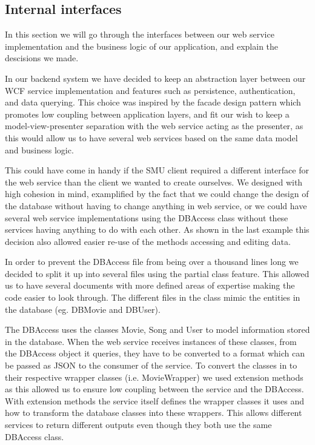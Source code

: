 \subsection{Internal interfaces}
In this section we will go through the interfaces between our web service implementation and the business logic of our application, and explain the descisions we made.

In our backend system we have decided to keep an abstraction layer between our WCF service implementation and features such as persistence, authentication, and data querying. This choice was inspired by the facade design pattern which promotes low coupling between application layers, and fit our wish to keep a model-view-presenter separation with the web service acting as the presenter, as this would allow us to have several web services based on the same data model and business logic.

This could have come in handy if the SMU client required a different interface for the web service than the client we wanted to create ourselves. We designed with high cohesion in mind, examplified by the fact that we could change the design of the database without having to change anything in web service, or we could have several web service implementations using the DBAccess class without these services having anything to do with each other. As shown in the last example this decision also allowed easier re-use of the methods accessing and editing data.

In order to prevent the DBAccess file from being over a thousand lines long we decided to split it up into several files using the partial class feature. This allowed us to have several documents with more defined areas of expertise making the code easier to look through.  The different files in the class mimic the entities in the database (eg. DBMovie and DBUser).

The DBAccess uses the classes Movie, Song and User to model information stored in the database. When the web service receives instances of these classes, from the DBAccess object it queries, they have to be converted to a format which can be passed as JSON to the consumer of the service. To convert the classes in to their respective wrapper classes (i.e. MovieWrapper) we used extension methods as this allowed us to ensure low coupling between the service and the DBAccess. With extension methods the service itself defines the wrapper classes it uses and how to transform the database classes into these wrappers. This allows different services to return different outputs even though they both use the same DBAccess class.